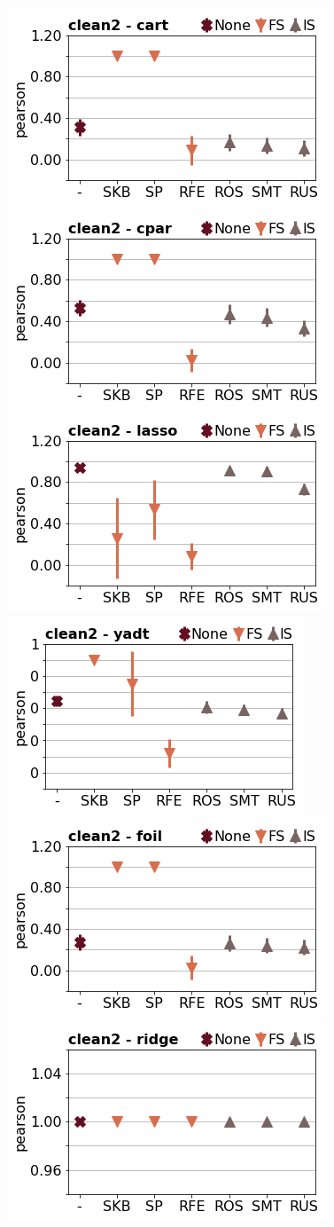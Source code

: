 \documentclass[runningheads,a4paper]{llncs}
\begin{document}
\begin{figure}[!h]
\includegraphics[width=0.32\linewidth]{fig/preps_clean2_DT_sklearn_sample_pearson.png}
\includegraphics[width=0.32\linewidth]{fig/preps_clean2_RB_cpar_sample_pearson.png}
\includegraphics[width=0.32\linewidth]{fig/preps_clean2_LM_lasso_sample_pearson.png}
\includegraphics[width=0.32\linewidth]{fig/preps_clean2_DT_yadt_sample_pearson.png}
\includegraphics[width=0.32\linewidth]{fig/preps_clean2_RB_foil_sample_pearson.png}
\includegraphics[width=0.32\linewidth]{fig/preps_clean2_LM_ridge_sample_pearson.png}
\end{figure}
\end{document}
